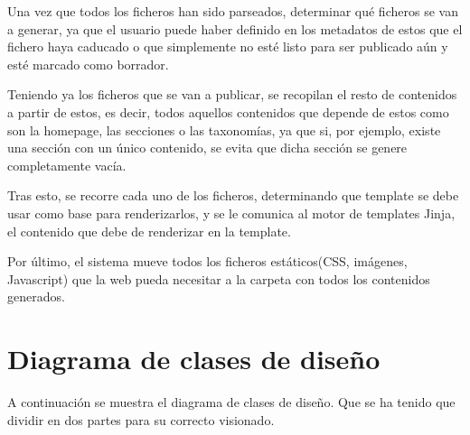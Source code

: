 Una vez que todos los ficheros han sido parseados, determinar qué ficheros se van a generar, ya que
el usuario puede haber definido en los metadatos de estos que el fichero haya caducado o que simplemente
no esté listo para ser publicado aún y esté marcado como borrador.

Teniendo ya los ficheros que se van a publicar, se recopilan el resto de contenidos a partir de estos, es decir,
todos aquellos contenidos que depende de estos como son la homepage, las secciones o las taxonomías,
ya que si, por ejemplo, existe una sección con un único contenido, se evita que dicha sección se genere
completamente vacía.

Tras esto, se recorre cada uno de los ficheros, determinando que template se debe usar como base para renderizarlos,
y se le comunica al motor de templates Jinja, el contenido que debe de renderizar en la template.

Por último, el sistema mueve todos los ficheros estáticos(CSS, imágenes, Javascript) que la web pueda necesitar
a la carpeta con todos los contenidos generados.



\section{Diagrama de clases de diseño}

A continuación se muestra el diagrama de clases de diseño. Que se ha tenido que dividir en dos partes
para su correcto visionado.

